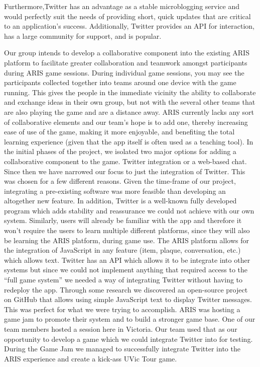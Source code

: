 \documentclass{sigchi}
\begin{document}
Furthermore,Twitter has an advantage as a stable microblogging service and would perfectly suit the needs of providing short, quick updates that are critical to an application’s success. Additionally, Twitter provides an API for interaction, has a large community for support, and is popular.

Our group intends to develop a collaborative component into the existing ARIS platform to facilitate greater collaboration and teamwork amongst participants during ARIS game sessions. During individual game sessions, you may see the participants collected together into teams around one device with the game running. This gives the people in the immediate vicinity the ability to collaborate and exchange ideas in their own group, but not with the several other teams that are also playing the game and are a distance away. ARIS currently lacks any sort of collaborative elements and our team’s hope is to add one, thereby increasing ease of use of the game, making it more enjoyable, and benefiting the total learning experience (given that the app itself is often used as a teaching tool).
In the initial phases of the project, we isolated two major options for adding a collaborative component to the game. Twitter integration or a web-based chat. Since then we have narrowed our focus to just the integration of Twitter. This was chosen for a few different reasons. Given the time-frame of our project, integrating a pre-existing software was more feasible than developing an altogether new feature. In addition, Twitter is a well-known fully developed program which adds stability and reassurance we could not achieve with our own system. Similarly, users will already be familiar with the app and therefore it won’t require the users to learn multiple different platforms, since they will also be learning the ARIS platform, during game use.
The ARIS platform allows for the integration of JavaScript in any feature (item, plaque, conversation, etc.) which allows text. Twitter has an API which allows it to be integrate into other systems but since we could not implement anything that required access to the “full game system” we needed a way of integrating Twitter without having to redeploy the app. Through some research we discovered an open-source project on GitHub that allows using simple JavaScript text to display Twitter messages. This was perfect for what we were trying to accomplish. 
ARIS was hosting a game jam to promote their system and to build a stronger game base. One of our team members hosted a session here in Victoria. Our team used that as our opportunity to develop a game which we could integrate Twitter into for testing. During the Game Jam we managed to successfully integrate Twitter into the ARIS experience and create a kick-ass UVic Tour game. 
\end{document}
